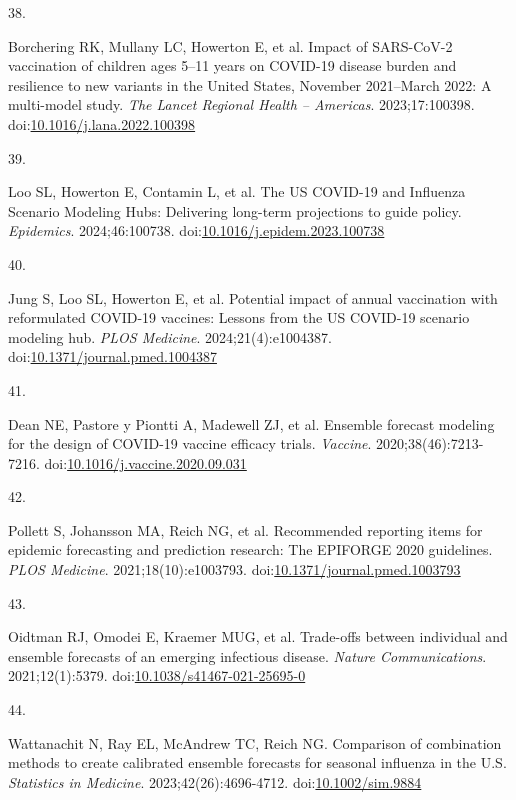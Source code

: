 \documentclass[
  letterpaper,
  DIV=11,
  numbers=noendperiod]{scrartcl}
\newlength{\cslhangindent}
\newlength{\csllabelwidth}
\newenvironment{CSLReferences}[2] %
 {\begin{list}{}{%
  \setlength{\itemindent}{0pt}
  \setlength{\leftmargin}{0pt}
  \setlength{\parsep}{0pt}
  \ifodd #1
   \setlength{\leftmargin}{\cslhangindent}
   \setlength{\itemindent}{-1\cslhangindent}
  \fi
  \setlength{\itemsep}{#2\baselineskip}}}
 {\end{list}}
\newcommand{\CSLLeftMargin}[1]{\parbox[t]{\csllabelwidth}{\strut#1\strut}}
\newcommand{\CSLRightInline}[1]{\parbox[t]{\linewidth - \csllabelwidth}{\strut#1\strut}}
\begin{document}
\begin{CSLReferences}{0}{1}
\CSLLeftMargin{38. }%
\CSLRightInline{Borchering RK, Mullany LC, Howerton E, et al. Impact of
{SARS}-{CoV}-2 vaccination of children ages 5--11 years on {COVID}-19
disease burden and resilience to new variants in the {United} {States},
{November} 2021--{March} 2022: {A} multi-model study. \emph{The Lancet
Regional Health -- Americas}. 2023;17:100398.
doi:\href{https://doi.org/10.1016/j.lana.2022.100398}{10.1016/j.lana.2022.100398}}

\CSLLeftMargin{39. }%
\CSLRightInline{Loo SL, Howerton E, Contamin L, et al. The {US}
{COVID}-19 and {Influenza} {Scenario} {Modeling} {Hubs}: {Delivering}
long-term projections to guide policy. \emph{Epidemics}. 2024;46:100738.
doi:\href{https://doi.org/10.1016/j.epidem.2023.100738}{10.1016/j.epidem.2023.100738}}

\CSLLeftMargin{40. }%
\CSLRightInline{Jung S, Loo SL, Howerton E, et al. Potential impact of
annual vaccination with reformulated {COVID}-19 vaccines: {Lessons} from
the {US} {COVID}-19 scenario modeling hub. \emph{PLOS Medicine}.
2024;21(4):e1004387.
doi:\href{https://doi.org/10.1371/journal.pmed.1004387}{10.1371/journal.pmed.1004387}}

\CSLLeftMargin{41. }%
\CSLRightInline{Dean NE, Pastore y Piontti A, Madewell ZJ, et al.
Ensemble forecast modeling for the design of {COVID}-19 vaccine efficacy
trials. \emph{Vaccine}. 2020;38(46):7213-7216.
doi:\href{https://doi.org/10.1016/j.vaccine.2020.09.031}{10.1016/j.vaccine.2020.09.031}}

\CSLLeftMargin{42. }%
\CSLRightInline{Pollett S, Johansson MA, Reich NG, et al. Recommended
reporting items for epidemic forecasting and prediction research: {The}
{EPIFORGE} 2020 guidelines. \emph{PLOS Medicine}. 2021;18(10):e1003793.
doi:\href{https://doi.org/10.1371/journal.pmed.1003793}{10.1371/journal.pmed.1003793}}

\CSLLeftMargin{43. }%
\CSLRightInline{Oidtman RJ, Omodei E, Kraemer MUG, et al. Trade-offs
between individual and ensemble forecasts of an emerging infectious
disease. \emph{Nature Communications}. 2021;12(1):5379.
doi:\href{https://doi.org/10.1038/s41467-021-25695-0}{10.1038/s41467-021-25695-0}}

\CSLLeftMargin{44. }%
\CSLRightInline{Wattanachit N, Ray EL, McAndrew TC, Reich NG. Comparison
of combination methods to create calibrated ensemble forecasts for
seasonal influenza in the {U}.{S}. \emph{Statistics in Medicine}.
2023;42(26):4696-4712.
doi:\href{https://doi.org/10.1002/sim.9884}{10.1002/sim.9884}}


\end{CSLReferences}
\end{document}
